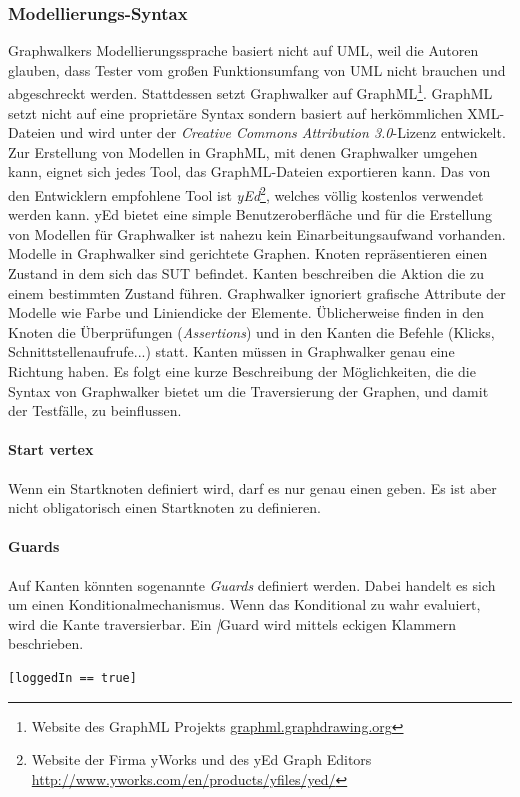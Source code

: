 \subsubsection{Modellierungs-Syntax}
Graphwalkers Modellierungssprache basiert nicht auf UML, weil die Autoren glauben, dass Tester vom großen Funktionsumfang von UML nicht brauchen und abgeschreckt werden. Stattdessen setzt Graphwalker auf GraphML\footnote{Website des GraphML Projekts \url{graphml.graphdrawing.org}}. GraphML setzt nicht auf eine proprietäre Syntax sondern basiert auf herkömmlichen XML-Dateien und wird unter der \textit{Creative Commons Attribution 3.0}-Lizenz entwickelt.\\
Zur Erstellung von Modellen in GraphML, mit denen Graphwalker umgehen kann, eignet sich jedes Tool, das GraphML-Dateien exportieren kann. Das von den Entwicklern empfohlene Tool ist \textit{yEd}\footnote{Website der Firma yWorks und des yEd Graph Editors \url{http://www.yworks.com/en/products/yfiles/yed/}}, welches völlig kostenlos verwendet werden kann. yEd bietet eine simple Benutzeroberfläche und für die Erstellung von Modellen für Graphwalker ist nahezu kein Einarbeitungsaufwand vorhanden.\\
Modelle in Graphwalker sind gerichtete Graphen. Knoten repräsentieren einen Zustand in dem sich das SUT befindet. Kanten beschreiben die Aktion die zu einem bestimmten Zustand führen. Graphwalker ignoriert grafische Attribute der Modelle wie Farbe und Liniendicke der Elemente. Üblicherweise finden in den Knoten die Überprüfungen (\textit{Assertions}) und in den Kanten die Befehle (Klicks, Schnittstellenaufrufe...) statt. Kanten müssen in Graphwalker genau eine Richtung haben. Es folgt eine kurze Beschreibung der Möglichkeiten, die die Syntax von Graphwalker bietet um die Traversierung der Graphen, und damit der Testfälle, zu beinflussen.

\paragraph{Start vertex} Wenn ein Startknoten definiert wird, darf es nur genau einen geben. Es ist aber nicht obligatorisch einen Startknoten zu definieren.

\paragraph{Guards} Auf Kanten könnten sogenannte \textit{Guards} definiert werden. Dabei handelt es sich um einen Konditionalmechanismus. Wenn das Konditional zu wahr evaluiert, wird die Kante traversierbar. Ein \textit|{Guard} wird mittels eckigen Klammern beschrieben.
\begin{verbatim}
[loggedIn == true]
\end{verbatim}

